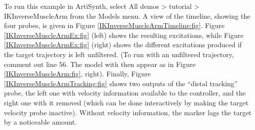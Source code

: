 To run this example in ArtiSynth, select {\sf All demos > tutorial >
IKInverseMuscleArm} from the {\sf Models} menu. A view of the timeline, showing
the four probes, is given in Figure \ref{IKInverseMuscleArmTimeline:fig}.
Figure \ref{IKInverseMuscleArmEx:fig} (left) shows the resulting excitations,
while Figure \ref{IKInverseMuscleArmEx:fig} (right) shows the different
excitations produced if the target trajectory is left unfiltered. (To run with
an unfiltered trajectory, comment out line 56. The model with then appear as in
Figure \ref{IKInverseMuscleArm:fig}, right). Finally, Figure
\ref{IKInverseMuscleArmTracking:fig} shows two outputs of the ``distal
tracking'' probe, the left one with velocity information available to the
controller, and the right one with it removed (which can be done interactively
by making the target velocity probe inactive).  Without velocity information,
the marker lags the target by a noticeable amount.

